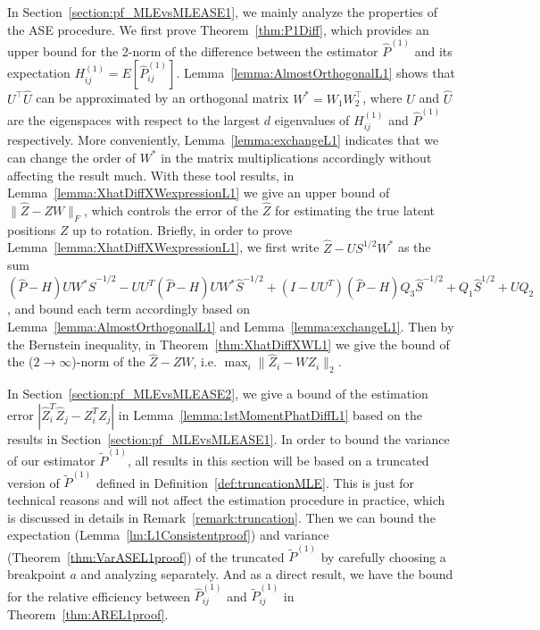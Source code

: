 \documentclass[a4paper]{article}
\renewcommand{\hat}{\widehat}
\begin{document}
In Section~\ref{section:pf_MLEvsMLEASE1}, we mainly analyze the properties of the ASE procedure. We first prove Theorem~\ref{thm:P1Diff}, which provides an upper bound for the 2-norm of the difference between the estimator $\hat{P}^{(1)}$ and its expectation $H_{ij}^{(1)} = E[\hat{P}_{ij}^{(1)}]$. Lemma~\ref{lemma:AlmostOrthogonalL1} shows that $U^{\top} \hat{U}$ can be approximated by an orthogonal matrix $W^{*} = W_1 W_2^{\top}$, where $U$ and $\hat{U}$ are the eigenspaces with respect to the largest $d$ eigenvalues of $H_{ij}^{(1)}$ and $\hat{P}^{(1)}$ respectively. More conveniently, Lemma~\ref{lemma:exchangeL1} indicates that we can change the order of $W^*$ in the matrix multiplications accordingly without affecting the result much. With these tool results, in Lemma~\ref{lemma:XhatDiffXWexpressionL1} we give an upper bound of $\|\hat{Z} - Z W\|_F$, which controls the error of the $\hat{Z}$ for estimating the true latent positions $Z$ up to rotation. Briefly, in order to prove Lemma~\ref{lemma:XhatDiffXWexpressionL1}, we first write $\hat{Z} - U S^{1/2} W^*$ as the sum $(\hat{P} - H) U W^* \hat{S}^{-1/2} - U U^T(\hat{P} - H)U W^*\hat{S}^{-1/2} + (I - U U^T)(\hat{P} - H) Q_3 \hat{S}^{-1/2} + Q_1 \hat{S}^{1/2} + U Q_2$, and bound each term accordingly based on Lemma~\ref{lemma:AlmostOrthogonalL1} and Lemma~\ref{lemma:exchangeL1}. Then by the Bernstein inequality, in Theorem~\ref{thm:XhatDiffXWL1} we give the bound of the ($2 \to \infty$)-norm of the $\hat{Z} - Z W$, i.e. $\max_i \| \hat{Z}_i - W Z_i \|_2$.

In Section~\ref{section:pf_MLEvsMLEASE2}, we give a bound of the estimation error $\left|  \hat{Z}_i^T \hat{Z}_j - Z_i^T Z_j \right|$ in Lemma~\ref{lemma:1stMomentPhatDiffL1} based on the results in Section~\ref{section:pf_MLEvsMLEASE1}. In order to bound the variance of our estimator $\widetilde{P}^{(1)}$, all results in this section will be based on a truncated version of $\widetilde{P}^{(1)}$ defined in Definition~\ref{def:truncationMLE}. This is just for technical reasons and will not affect the estimation procedure in practice, which is discussed in details in Remark~\ref{remark:truncation}. Then we can bound the expectation (Lemma~\ref{lm:L1Consistentproof}) and variance (Theorem~\ref{thm:VarASEL1proof}) of the truncated $\widetilde{P}^{(1)}$ by carefully choosing a breakpoint $a$ and analyzing separately. And as a direct result, we have the bound for the relative efficiency between $\hat{P}_{ij}^{(1)}$ and $\widetilde{P}_{ij}^{(1)}$ in Theorem~\ref{thm:AREL1proof}.
\end{document}
